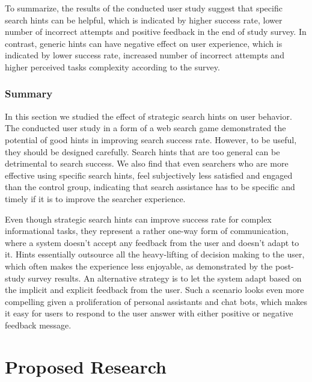 To summarize, the results of the conducted user study suggest that specific search hints can be helpful, which is indicated by higher success rate, lower number of incorrect attempts and positive feedback in the end of study survey.
In contrast, generic hints can have negative effect on user experience, which is indicated by lower success rate, increased number of incorrect attempts and higher perceived tasks complexity according to the survey.

\subsubsection{Summary}
\label{section:users:hints:summary}

In this section we studied the effect of strategic search hints on user behavior. 
The conducted user study in a form of a web search game demonstrated the potential of good hints in improving search success rate.
However, to be useful, they should be designed carefully.
Search hints that are too general can be detrimental to search success.
We also find that even searchers who are more effective using specific search hints, feel subjectively less satisfied and engaged than the control group, indicating that search assistance has to be specific and timely if it is to improve the searcher experience.

Even though strategic search hints can improve success rate for complex informational tasks, they represent a rather one-way form of communication, where a system doesn't accept any feedback from the user and doesn't adapt to it.
Hints essentially outsource all the heavy-lifting of decision making to the user, which often makes the experience less enjoyable, as demonstrated by the post-study survey results.
An alternative strategy is to let the system adapt based on the implicit and explicit feedback from the user.
Such a scenario looks even more compelling given a proliferation of personal assistants and chat bots, which makes it easy for users to respond to the user answer with either positive or negative feedback message.


\section{Proposed Research}
\label{section:users:proposal}

